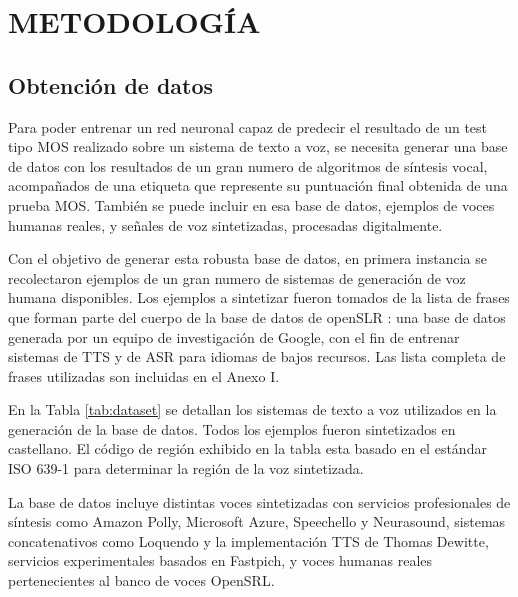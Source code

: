 \section{METODOLOGÍA}
\subsection{Obtención de datos}
Para poder entrenar un red neuronal capaz de predecir el resultado de un test tipo MOS realizado sobre un sistema de texto a voz, se necesita generar una base de datos con los resultados de un gran numero de algoritmos de síntesis vocal, acompañados de una etiqueta que represente su puntuación final obtenida de una prueba MOS. También se puede incluir en esa base de datos, ejemplos de voces humanas reales, y señales de voz sintetizadas, procesadas digitalmente.

Con el objetivo de generar esta robusta base de datos, en primera instancia se recolectaron ejemplos de un gran numero de sistemas de generación de voz humana disponibles. Los ejemplos a sintetizar fueron tomados de la lista de frases que forman parte del cuerpo de la base de datos de openSLR \cite{opensrl}: una base de datos generada por un equipo de investigación de Google, con el fin de entrenar sistemas de TTS y de ASR para idiomas de bajos recursos. Las lista completa de frases utilizadas son incluidas en el Anexo I.

En la Tabla \eqref{tab:dataset} se detallan los sistemas de texto a voz utilizados en la generación de la base de datos. Todos los ejemplos fueron sintetizados en castellano. El código de región exhibido en la tabla esta basado en el estándar ISO 639-1 para determinar la región de la voz sintetizada.

La base de datos incluye distintas voces sintetizadas con servicios profesionales de síntesis como Amazon Polly, Microsoft Azure, Speechello y Neurasound, sistemas concatenativos como Loquendo y la implementación TTS de Thomas Dewitte, servicios experimentales basados en Fastpich, y voces humanas reales pertenecientes al banco de voces OpenSRL.


